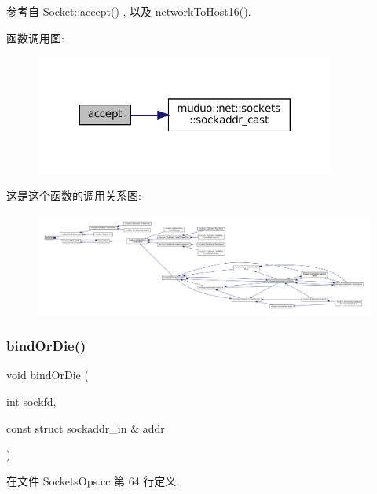 参考自 Socket\+::accept() , 以及 network\+To\+Host16().

函数调用图\+:
\nopagebreak
\begin{figure}[H]
\begin{center}
\leavevmode
\includegraphics[width=281pt]{namespacemuduo_1_1sockets_a5fe7cd11cb2662939917285c51b3f992_cgraph}
\end{center}
\end{figure}
这是这个函数的调用关系图\+:
\nopagebreak
\begin{figure}[H]
\begin{center}
\leavevmode
\includegraphics[width=350pt]{namespacemuduo_1_1sockets_a5fe7cd11cb2662939917285c51b3f992_icgraph}
\end{center}
\end{figure}
\mbox{\label{namespacemuduo_1_1sockets_a8fe4065cd24e49e158dd1c16cd693ae1}} 
\subsubsection{\texorpdfstring{bind\+Or\+Die()}{bindOrDie()}}
{\footnotesize\ttfamily void bind\+Or\+Die (\begin{DoxyParamCaption}\item[{int}]{sockfd,  }\item[{const struct sockaddr\+\_\+in \&}]{addr }\end{DoxyParamCaption})}



在文件 Sockets\+Ops.\+cc 第 64 行定义.




